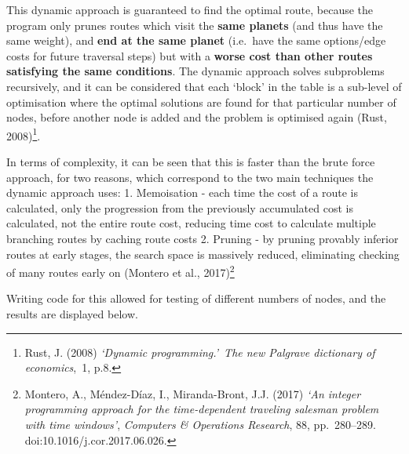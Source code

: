 \documentclass[
]{article}
\begin{document}
This dynamic approach is guaranteed to find the optimal route, because
the program only prunes routes which visit the \textbf{same planets}
(and thus have the same weight), and \textbf{end at the same planet}
(i.e.~have the same options/edge costs for future traversal steps) but
with a \textbf{worse cost than other routes satisfying the same
conditions}. The dynamic approach solves subproblems recursively, and it
can be considered that each `block' in the table is a sub-level of
optimisation where the optimal solutions are found for that particular
number of nodes, before another node is added and the problem is
optimised again (Rust, 2008)\footnote{Rust, J. (2008) \emph{`Dynamic
  programming.'}~\emph{The new Palgrave dictionary of economics},~1,
  p.8.}.

In terms of complexity, it can be seen that this is faster than the
brute force approach, for two reasons, which correspond to the two main
techniques the dynamic approach uses: 1. Memoisation - each time the
cost of a route is calculated, only the progression from the previously
accumulated cost is calculated, not the entire route cost, reducing time
cost to calculate multiple branching routes by caching route costs 2.
Pruning - by pruning provably inferior routes at early stages, the
search space is massively reduced, eliminating checking of many routes
early on (Montero et al., 2017)\footnote{Montero, A., Méndez-Díaz, I.,
  Miranda-Bront, J.J. (2017) \emph{`An integer programming approach for
  the time-dependent traveling salesman problem with time windows'},
  \emph{Computers \& Operations Research}, 88, pp.~280--289.
  doi:10.1016/j.cor.2017.06.026.}

Writing code for this allowed for testing of different numbers of nodes,
and the results are displayed below.
\end{document}
